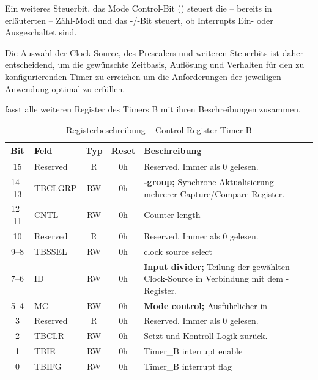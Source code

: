 Ein weiteres Steuerbit, das \glqq{}Mode Control\grqq{}-Bit () steuert die -- bereits in  erl\"auterten -- Z\"ahl-Modi und das -/-Bit steuert, ob Interrupts Ein- oder Ausgeschaltet sind.

Die Auswahl der Clock-Source, des Prescalers und weiteren Steuerbits ist daher entscheidend, um die gew\"unschte Zeitbasis, Aufl\"osung und Verhalten f\"ur den zu konfigurierenden Timer zu erreichen um die Anforderungen der jeweiligen Anwendung optimal zu erf\"ullen.

 fasst alle weiteren Register des Timers B mit ihren Beschreibungen zusammen.\AI

\begin{table}[h!]
	\small
	\centering
	\begin{tabular}{|c|l|c|c|p{8cm}|}
		\hline
		\textbf{Bit} & \textbf{Feld} & \textbf{Typ} & \textbf{Reset} & \textbf{Beschreibung} \\ \hline
		15 & Reserved & R & 0h & Reserved. Immer als 0 gelesen. \\ \hline
		14–13 & TBCLGRP & RW & 0h & \textbf{\Code{TBxCLn}-group;} Synchrone Aktualisierung mehrerer Capture/Compare-Register. \\ \hline
		12–11 & CNTL & RW & 0h & Counter length \\ \hline
		10 & Reserved & R & 0h & Reserved. Immer als 0 gelesen. \\ \hline
		9–8 & TBSSEL & RW & 0h & clock source select \\ \hline
		7–6 & ID & RW & 0h & \textbf{Input divider;} Teilung der gew\"ahlten Clock-Source in Verbindung mit dem \Code{TBIDEX}-Register. \\ \hline
		5–4 & MC & RW & 0h & \textbf{Mode control;} Ausf\"uhrlicher in \Kapitel{Timer_CountMode} \\ \hline
		3 & Reserved & R & 0h & Reserved. Immer als 0 gelesen. \\ \hline
		2 & TBCLR & RW & 0h & Setzt \Code{TBR} und Kontroll-Logik zur\"uck. \\ \hline
		1 & TBIE & RW & 0h & Timer\_B interrupt enable \\ \hline
		0 & TBIFG & RW & 0h & Timer\_B interrupt flag \\ \hline
	\end{tabular}
	\caption{Registerbeschreibung – Control Register Timer B\\}
	\label{tab:tb_c_register}
\end{table}


